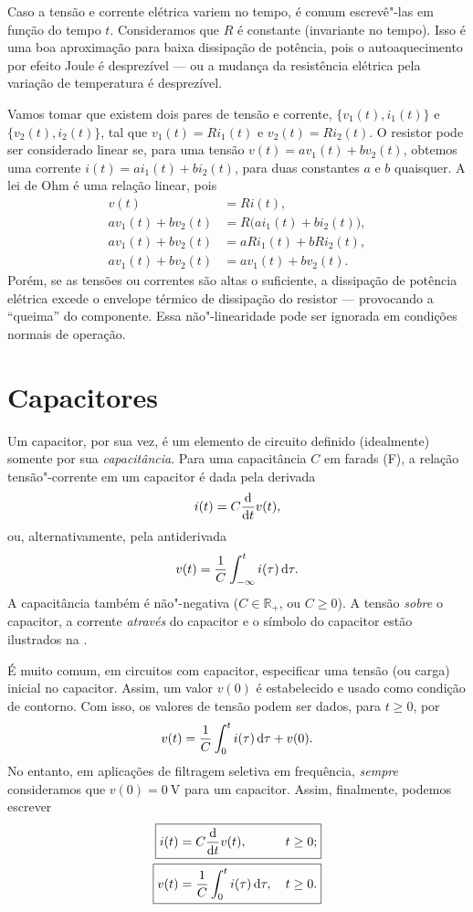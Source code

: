 Caso a tensão e corrente elétrica variem no tempo, é comum escrevê"-las em função do tempo $t$. Consideramos que $R$ é constante (invariante no tempo). Isso é uma boa aproximação para baixa dissipação de potência, pois o autoaquecimento por efeito Joule é desprezível --- ou a mudança da resistência elétrica pela variação de temperatura é desprezível.

Vamos tomar que existem dois pares de tensão e corrente, $\{v_1(t), i_1(t)\}$ e $\{v_2(t), i_2(t)\}$, tal que $v_1(t)=Ri_1(t)$ e $v_2(t)=Ri_2(t)$. O resistor pode ser considerado linear se, para uma tensão $v(t)=av_1(t)+bv_2(t)$, obtemos uma corrente $i(t)=ai_1(t)+bi_2(t)$, para duas constantes $a$ e $b$ quaisquer. A lei de Ohm é uma relação linear, pois
\begin{align*}
	v(t)&=Ri(t),\\
	av_1(t)+bv_2(t)&=R\big(ai_1(t)+bi_2(t)\big),\\
	av_1(t)+bv_2(t)&=aRi_1(t)+bRi_2(t),\\
	av_1(t)+bv_2(t)&=av_1(t)+bv_2(t).
\end{align*}
Porém, se as tensões ou correntes são altas o suficiente, a dissipação de potência elétrica excede o envelope térmico de dissipação do resistor --- provocando a \enquote{queima} do componente. Essa não"-linearidade pode ser ignorada em condições normais de operação.

\section{Capacitores}
Um capacitor, por sua vez, é um elemento de circuito definido (idealmente) somente por sua \emph{capacitância}. Para uma capacitância $C$ em farads (\unit{\farad}), a relação tensão"-corrente em um capacitor é dada pela derivada
\begin{equation*}
	i(t)=C\diff{v(t)}{t},
\end{equation*}
ou, alternativamente, pela antiderivada
\begin{equation*}
	v(t)=\frac{1}{C}\intd{i(\tau)}{\tau}{-\infty}{t}.
\end{equation*}
A capacitância também é não"-negativa ($C\in\mathbb{R}_+$, ou $C\geq0$). A tensão \emph{sobre} o capacitor, a corrente \emph{através} do capacitor e o símbolo do capacitor estão ilustrados na .

É muito comum, em circuitos com capacitor, especificar uma tensão (ou carga) inicial no capacitor. Assim, um valor $v(0)$ é estabelecido e usado como condição de contorno. Com isso, os valores de tensão podem ser dados, para $t\geq0$, por
\begin{equation*}
	v(t)=\frac{1}{C}\intd{i(\tau)}{\tau}{0}{t}+v(0).
\end{equation*}
No entanto, em aplicações de filtragem seletiva em frequência, \emph{sempre} consideramos que $v(0)=\qty{0}{\volt}$ para um capacitor. Assim, finalmente, podemos escrever
\begin{align}\label{eq:iC}
	\Aboxed{i(t)&=C\diff{v(t)}{t},\qquad\quad t\geq0;}\\\label{eq:vC}
	\Aboxed{v(t)&=\frac{1}{C}\intd{i(\tau)}{\tau}{0}{t},\quad t\geq0.}
\end{align}


